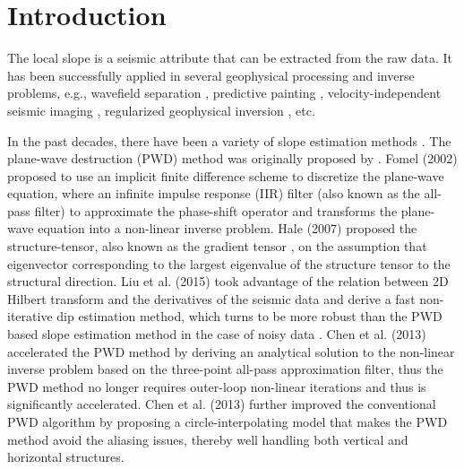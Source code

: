\section{Introduction}
The local slope is a seismic attribute that can be extracted from the raw data. It has been successfully applied in several geophysical processing and inverse problems, e.g., wavefield separation \cite{harlan1984signal,fomel2002pwd}, predictive painting \cite{fomel2010predictive}, velocity-independent seismic imaging \cite{fomel2007velocity}, regularized geophysical inversion \cite{fomel2007shape}, etc. 


In the past decades, there have been a variety of slope estimation methods . The plane-wave destruction (PWD) method was originally proposed by \cite{claerbout1992pvi}. Fomel (2002) \cite{fomel2002pwd} proposed to use an implicit finite difference scheme to discretize the plane-wave equation, where an infinite impulse response (IIR) filter (also known as the all-pass filter) to approximate the phase-shift operator and transforms the plane-wave equation into a non-linear inverse problem. Hale (2007) \cite{hale2007local} proposed the structure-tensor, also known as the gradient tensor \cite{van1995estimators},  on the assumption that eigenvector corresponding to the largest eigenvalue of the structure tensor  to the structural direction.  Liu et al. (2015) \cite{liuyang2015} took advantage of the relation between 2D Hilbert transform and the derivatives of the seismic data and derive a fast non-iterative dip estimation method, which turns to be more robust than the PWD based slope estimation method in the case of noisy data \cite{yangkang2018gji3}. Chen et al. (2013) \cite{zhonghuan2013accelerated} accelerated the PWD method by deriving an analytical solution to the non-linear inverse problem based on the three-point all-pass approximation filter, thus the PWD method no longer requires outer-loop non-linear iterations and thus is significantly accelerated. Chen et al. (2013) \cite{zhonghuan2013omnidirectional} further improved the conventional PWD algorithm by proposing a circle-interpolating model that makes the PWD method avoid the aliasing issues, thereby well handling both vertical and horizontal structures.

